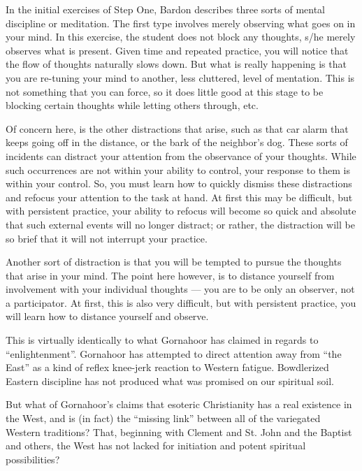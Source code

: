 \begin{quotationx}
In the initial exercises of Step One, Bardon describes three sorts of mental discipline or meditation. The first type involves merely observing what goes on in your mind. In this exercise, the student does not block any thoughts, s/he merely observes what is present. Given time and repeated practice, you will notice that the flow of thoughts naturally slows down. But what is really happening is that you are re-tuning your mind to another, less cluttered, level of mentation. This is not something that you can force, so it does little good at this stage to be blocking certain thoughts while letting others through, etc.

Of concern here, is the other distractions that arise, such as that car alarm that keeps going off in the distance, or the bark of the neighbor's dog. These sorts of incidents can distract your attention from the observance of your thoughts. While such occurrences are not within your ability to control, your response to them is within your control. So, you must learn how to quickly dismiss these distractions and refocus your attention to the task at hand. At first this may be difficult, but with persistent practice, your ability to refocus will become so quick and absolute that such external events will no longer distract; or rather, the distraction will be so brief that it will not interrupt your practice.

Another sort of distraction is that you will be tempted to pursue the thoughts that arise in your mind. The point here however, is to distance yourself from involvement with your individual thoughts --- you are to be only an observer, not a participator. At first, this is also very difficult, but with persistent practice, you will learn how to distance yourself and observe.
\end{quotationx}

This is virtually identically to what Gornahoor has claimed in regards to ``enlightenment''. Gornahoor has attempted to direct attention away from ``the East'' as a kind of reflex knee-jerk reaction to Western fatigue. Bowdlerized Eastern discipline has not produced what was promised on our spiritual soil.

But what of Gornahoor's claims that esoteric Christianity has a real existence in the West, and is (in fact) the ``missing link'' between all of the variegated Western traditions? That, beginning with Clement and St. John and the Baptist and others, the West has not lacked for initiation and potent spiritual possibilities?

